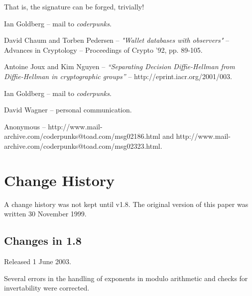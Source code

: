 \documentclass[a4paper,titlepage]{article}
\begin{document}

That is, the signature can be forged, trivially!

\begin{thebibliography}{99}

	 Ian Goldberg -- mail to {\sl coderpunks}.

	 David Chaum and Torben Pedersen -- {\sl
	"Wallet databases with observers"} -- Advances in Cryptology
	-- Proceedings of Crypto '92, pp. 89-105.

	 Antoine Joux and Kim Nguyen -- {\sl
	``Separating Decision Diffie-Hellman from Diffie-Hellman in
	cryptographic groups''} -- http://eprint.iacr.org/2001/003.

	 Ian Goldberg -- mail to {\sl coderpunks}.

	 David Wagner -- personal communication.

	 Anonymous --
	http://www.mail-archive.com/coderpunks@toad.com/msg02186.html
	and
	http://www.mail-archive.com/coderpunks@toad.com/msg02323.html.

\end{thebibliography}

\section{Change History}

A change history was not kept until v1.8. The original version of this
paper was written 30 November 1999.

\subsection{Changes in 1.8}

Released 1 June 2003.

Several errors in the handling of exponents in modulo arithmetic and
checks for invertability were corrected.
\end{document}
